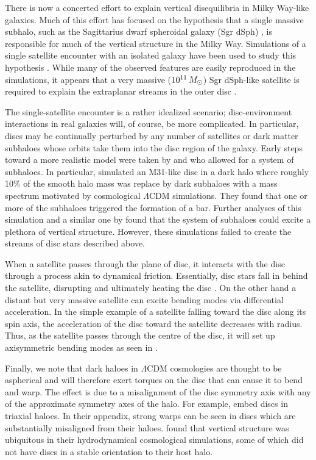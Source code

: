 There is now a concerted effort to explain vertical disequilibria in
Milky Way-like galaxies. Much of this effort has focused on the
hypothesis that a single massive subhalo, such as the Sagittarius
dwarf spheroidal galaxy (Sgr dSph) \citep{ibata_discovery}, is
responsible for much of the vertical structure in the Milky
Way. Simulations of a single satellite encounter with an isolated
galaxy have been used to study this hypothesis \citep[for
  example]{purcell2011,gomez_2013,widrow_2014,feldmann_2015, dlv_2015,
  donghia_2016, laporte_2016, laporte_2018, laporte_2018_b}. While
many of the observed features are easily reproduced in the
simulations, it appears that a very massive ($10^{11}\,M_\odot$) Sgr
dSph-like satellite is required to explain the extraplanar streams in
the outer disc \citep{laporte_2018_b}.

The single-satellite encounter is a rather idealized scenario;
disc-environment interactions in real galaxies will, of course, be
more complicated. In particular, discs may be continually perturbed by
any number of satellites or dark matter subhaloes whose orbits take
them into the disc region of the galaxy. Early steps toward a more
realistic model were taken by \citet{font_2001} and
\citet{gauthier_2006} who allowed for a system of subhaloes. In
particular, \citet{gauthier_2006} simulated an M31-like disc in a dark
halo where roughly 10\% of the smooth halo mass was replace by dark
subhaloes with a mass spectrum motivated by cosmological $\Lambda$CDM
simulations. They found that one or more of the subhaloes triggered the
formation of a bar. Further analyses of this simulation and a similar
one by \citet{chequers_2018} found that the system of subhaloes could
excite a plethora of vertical structure. However, these simulations
failed to create the streams of disc stars described above.

When a satellite passes through the plane of disc, it interacts with
the disc through a process akin to dynamical friction. Essentially,
disc stars fall in behind the satellite, disrupting and ultimately
heating the disc \citep{sellwood_1998}. On the other hand a distant
but very massive satellite can excite bending modes via differential
acceleration. In the simple example of a satellite falling toward the
disc along its spin axis, the acceleration of the disc toward the
satellite decreases with radius. Thus, as the satellite passes
through the centre of the disc, it will set up axisymmetric bending
modes as seen in \citet{sellwood_1996}.

Finally, we note that dark haloes in $\Lambda$CDM cosmologies are
thought to be aspherical and will therefore exert torques on the disc
that can cause it to bend and warp. The effect is due to a
misalignment of the disc symmetry axis with any of the approximate
symmetry axes of the halo. For example, \citet{hu_2016} embed discs
in triaxial haloes. In their appendix, strong warps can be seen in
discs which are substantially misaligned from their
haloes. \citet{gomez_2017} found that vertical structure was
ubiquitous in their hydrodynamical cosmological simulations, some of
which did not have discs in a stable orientation to their host halo.

